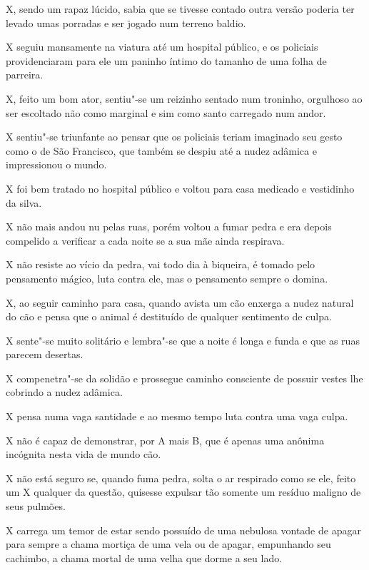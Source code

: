 X, sendo um rapaz lúcido, sabia que se tivesse contado outra versão
poderia ter levado umas porradas e ser jogado num terreno baldio.

X seguiu mansamente na viatura até um hospital público, e os policiais
providenciaram para ele um paninho íntimo do tamanho de uma folha de
parreira.

X, feito um bom ator, sentiu"-se um reizinho sentado num troninho,
orgulhoso ao ser escoltado não como marginal e sim como santo carregado
num andor.

X sentiu"-se triunfante ao pensar que os policiais teriam imaginado seu
gesto como o de São Francisco, que também se despiu até a nudez adâmica
e impressionou o mundo.

X foi bem tratado no hospital público e voltou para casa medicado e
vestidinho da silva.

X não mais andou nu pelas ruas, porém voltou a fumar pedra e era depois
compelido a verificar a cada noite se a sua mãe ainda respirava.

X não resiste ao vício da pedra, vai todo dia à biqueira, é tomado pelo
pensamento mágico, luta contra ele, mas o pensamento sempre o domina.

X, ao seguir caminho para casa, quando avista um cão enxerga a nudez
natural do cão e pensa que o animal é destituído de qualquer sentimento
de culpa.

X sente"-se muito solitário e lembra"-se que a noite é longa e funda e que
as ruas parecem desertas.

X compenetra"-se da solidão e prossegue caminho consciente de possuir
vestes lhe cobrindo a nudez adâmica.

X pensa numa vaga santidade e ao mesmo tempo luta contra uma vaga culpa.

X não é capaz de demonstrar, por A mais B, que é apenas uma anônima
incógnita nesta vida de mundo cão.

X não está seguro se, quando fuma pedra, solta o ar respirado como se
ele, feito um X qualquer da questão, quisesse expulsar tão somente um
resíduo maligno de seus pulmões.

X carrega um temor de estar sendo possuído de uma nebulosa vontade de
apagar para sempre a chama mortiça de uma vela ou de apagar, empunhando
seu cachimbo, a chama mortal de uma velha que dorme a seu lado.

\begin{center}\asterisc{}\end{center}


